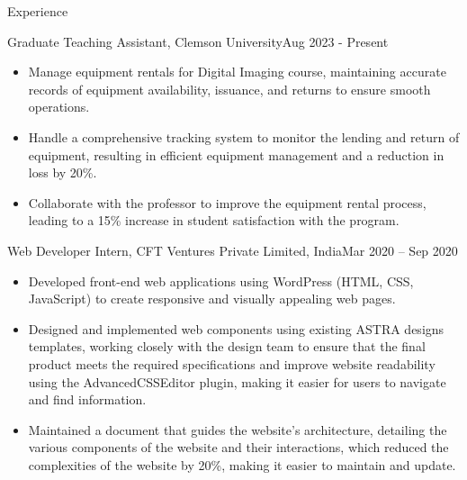 \documentclass[]{mcdowellcv}
\begin{document}
    \begin{cvsection}{Experience}
            \begin{cvsubsection}{Graduate Teaching Assistant, Clemson University}{}{Aug 2023 - Present}
                \begin{itemize}
                    \item Manage equipment rentals for Digital Imaging course, maintaining accurate records of equipment availability, issuance, and returns to ensure smooth operations.
                    \item Handle a comprehensive tracking system to monitor the lending and return of equipment, resulting in efficient equipment management and a reduction in loss by 20\%.
                    \item Collaborate with the professor to improve the equipment rental process, leading to a 15\% increase in student satisfaction with the program.
                \end{itemize}
                
            \end{cvsubsection}
		\begin{cvsubsection}{Web Developer Intern, CFT Ventures Private Limited, India}{}{Mar 2020 -- Sep 2020} 
                \begin{itemize}
                        \item Developed front-end web applications using WordPress (HTML, CSS, JavaScript) to create responsive and visually appealing web pages.
                        \item Designed and implemented web components using existing ASTRA designs templates, working closely with the design team to ensure that the final product meets the required specifications and improve website readability using the AdvancedCSSEditor plugin, making it easier for users to navigate and find information.
                        \item Maintained a document that guides the website’s architecture, detailing the various components of the website and their interactions, which reduced the complexities of the website by 20\%, making it easier to maintain and update.
                    \end{itemize}
		\end{cvsubsection}
	\end{cvsection}
	
	
	
	
\end{document}
